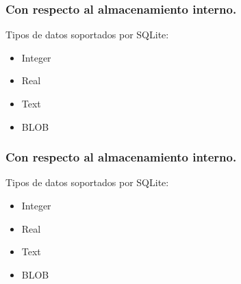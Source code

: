 \documentclass[14pt]{beamer}
\begin{document}
\begin{frame}
\begin{columns}
\begin{column}{0.5\textwidth}
\begin{center}
\end{center}
\end{column}
\end{columns}

\end{frame}


\begin{frame}
\frametitle{Con respecto al almacenamiento interno.}
Tipos de datos soportados por SQLite:
\begin{itemize}
\item Integer
\item Real
\item Text
\item BLOB
\end{itemize}

\end{frame}


\begin{frame}
\frametitle{Con respecto al almacenamiento interno.}
Tipos de datos soportados por SQLite:
\begin{itemize}
\item Integer
\item Real
\item Text
\item BLOB
\end{itemize}

\end{frame}
\end{document}
